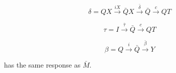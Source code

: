 $$\delta = QX \xrightarrow{iX} \bar{Q}X \xrightarrow{\bar{\delta}} \bar{Q} \xrightarrow{c} QT$$

$$\tau = I \xrightarrow{\bar{\tau}} \bar{Q} \xrightarrow{c} QT$$

$$\beta = Q \xrightarrow{i} \bar{Q} \xrightarrow{\bar{\beta}} Y$$

has the same response as $\bar{M}$.